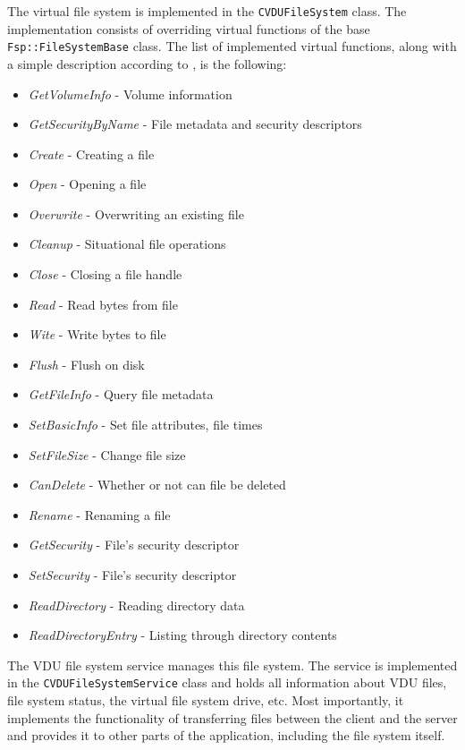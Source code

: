 The virtual file system is implemented in the \lstinline{CVDUFileSystem} class. The implementation consists of overriding virtual functions of the base \lstinline{Fsp::FileSystemBase} class. The list of implemented virtual functions, along with a simple description according to \cite{WinFspTutorial}, is the following:
\begin{itemize}
    \item \textit{GetVolumeInfo} - Volume information
    \item \textit{GetSecurityByName} - File metadata and security descriptors
    \item \textit{Create} - Creating a file
    \item \textit{Open} - Opening a file
    \item \textit{Overwrite} - Overwriting an existing file
    \item \textit{Cleanup} - Situational file operations
    \item \textit{Close} - Closing a file handle
    \item \textit{Read} - Read bytes from file
    \item \textit{Wite} - Write bytes to file
    \item \textit{Flush} - Flush on disk
    \item \textit{GetFileInfo} - Query file metadata
    \item \textit{SetBasicInfo} - Set file attributes, file times
    \item \textit{SetFileSize} - Change file size
    \item \textit{CanDelete} - Whether or not can file be deleted
    \item \textit{Rename} - Renaming a file
    \item \textit{GetSecurity} - File's security descriptor
    \item \textit{SetSecurity} - File's security descriptor
    \item \textit{ReadDirectory} - Reading directory data
    \item \textit{ReadDirectoryEntry} - Listing through directory contents
\end{itemize}
The VDU file system service manages this file system. The service is implemented in the \lstinline{CVDUFileSystemService} class and holds all information about VDU files, file system status, the virtual file system drive, etc. Most importantly, it implements the functionality of transferring files between the client and the server and provides it to other parts of the application, including the file system itself.

